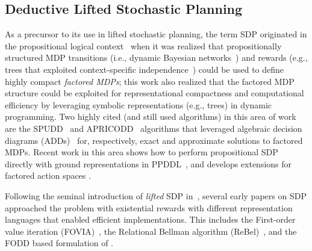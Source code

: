  
%
%
%
%


\subsection{Deductive Lifted Stochastic Planning}

As a precursor to its use in lifted stochastic planning, the term SDP
originated in the propositional logical
context~\cite{bout-dean-hanks,boutilier99dt} when it was realized that
propositionally structured MDP transitions (i.e., dynamic Bayesian
networks~\cite{dbn}) and rewards (e.g., trees that exploited
context-specific independence~\cite{csi}) could be used to define
highly compact \textit{factored MDPs}; this work also realized that the
factored MDP structure could be exploited for representational
compactness and computational efficiency by leveraging symbolic
representations (e.g., trees) in dynamic programming.  Two highly
cited (and still used algorithms) in this area of work are the
SPUDD~\cite{spudd} and APRICODD~\cite{apricodd} algorithms that
leveraged algebraic decision diagrams (ADDs)~\cite{BaharFrGaHaMaPaSo93} for,
respectively, exact and approximate solutions to factored MDPs.
Recent work in this area \cite{lesner:ppddl11} shows how to perform propositional SDP 
directly with  ground representations in PPDDL~\cite{ppddl}, and develops extensions
for factored action spaces \cite{raghavan2012planning,raghavan2013symbolic}.

%
%
%
%
%
%

%
%
%
%
%
%
%
%

Following the seminal introduction of {\it lifted} SDP
in~\cite{BoutilierRePr01}, several early papers on SDP approached the
problem with existential rewards with different representation
languages that enabled efficient implementations. This includes the
First-order value iteration
(FOVIA)~\citep{lao_fovia,HolldoblerKaSk2006}, the Relational Bellman
algorithm (ReBel)~\citep{KerstingOtDe04}, and the FODD based
formulation of \citep{WangJoKh08,JoshiKh08,JoshiKeKh10}.

